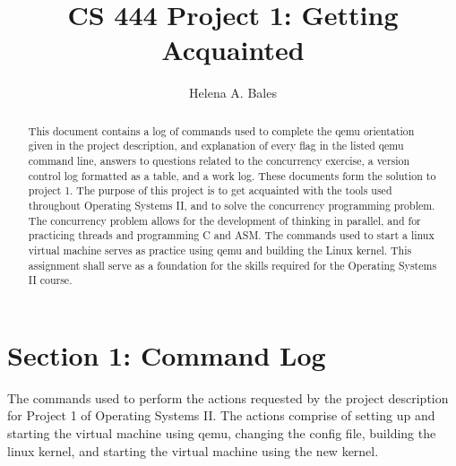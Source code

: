 \documentclass[letterpaper,10pt]{article}
\title{CS 444 Project 1: Getting Acquainted}
\author{Helena A. Bales}
\begin{document}
\maketitle

\begin{abstract}
This document contains a log of commands used to complete the qemu orientation
given in the project description, and explanation of every flag in the listed
qemu command line, answers to questions related to the concurrency exercise, a
version control log formatted as a table, and a work log. These documents form
the solution to project 1. The purpose of this project is to get acquainted with
the tools used throughout Operating Systems II, and to solve the concurrency
programming problem. The concurrency problem allows for the development of
thinking in parallel, and for practicing threads and programming C and ASM. The
commands used to start a linux virtual machine serves as practice using qemu and
building the Linux kernel. This assignment shall serve as a foundation for the
skills required for the Operating Systems II course.
\end{abstract}

\clearpage

\tableofcontents

\clearpage

\section{Section 1: Command Log}
The commands used to perform the actions requested by the project description
for Project 1 of Operating Systems II.  The actions comprise of setting up and
starting the virtual machine using qemu, changing the config file, building the
linux kernel, and starting the virtual machine using the new kernel.
\end{document}
